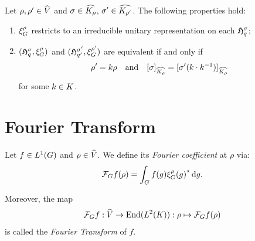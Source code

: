 \begin{proposition}
\label{proposition:unitary_dual}
    Let $\rho, \rho' \in {\widehat{V}}$
    and $\sigma \in {\widehat{{{K}_{\rho}}}}$,
    $\sigma' \in {\widehat{{{K}_{\rho'}}}}$.
    The following properties hold:
    \begin{enumerate}
        \item $\xi^{\rho}_G$ restricts to an irreducible unitary representation on each ${\mathfrak{H}^{\sigma}_{q}}$;
        \item $({\mathfrak{H}^{\sigma}_{q}}, \xi^{\rho}_G)$ and $({\mathfrak{H}^{\sigma'}_{q'}}, \xi^{\rho'}_G)$ are equivalent if and only if
            \begin{align*}
                \rho' = k \rho \quad \text{and} \quad {{[\sigma]}_{{\widehat{{{K}_{\rho}}}}}} = {{[\sigma'(k \cdot k^{-1})]}_{{\widehat{{{K}_{\rho}}}}}}
            \end{align*}
            for some $k \in K$.
    \end{enumerate}
\end{proposition}

\section{Fourier Transform}
\label{section:Fourier_transform}

\begin{definition}
\label{definition:Fourier_Transform}
    Let $f \in {L^{1} (G)}$ and $\rho \in {\widehat{V}}$.
    We define its \emph{Fourier coefficient} at $\rho$ via:
    \begin{align*}
        \mathcal{F}_{G} {f}(\rho) = \int_G f(g) {\xi^{\rho}_G(g)}^\star \,\mathrm{d} g.
    \end{align*}

    Moreover, the map
    \begin{align*}
        \mathcal{F}_{G} {f} : {\widehat{V}} \to \operatorname{End}({L^{2} (K)}) :
        \rho \mapsto \mathcal{F}_{G} {f}(\rho)
    \end{align*}
    is called the \emph{Fourier Transform} of $f$.
\end{definition}

